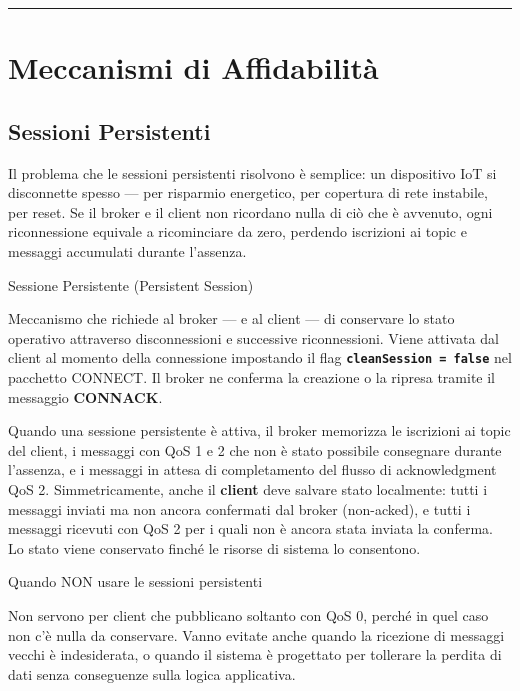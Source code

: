 \documentclass[
  italian,
  openany]{book}
\begin{document}
\begin{center}\rule{0.5\linewidth}{0.5pt}\end{center}

\section{Meccanismi di
Affidabilità}\label{meccanismi-di-affidabilituxe0}

\subsection{Sessioni Persistenti}\label{sessioni-persistenti}

Il problema che le sessioni persistenti risolvono è semplice: un
dispositivo IoT si disconnette spesso --- per risparmio energetico, per
copertura di rete instabile, per reset. Se il broker e il client non
ricordano nulla di ciò che è avvenuto, ogni riconnessione equivale a
ricominciare da zero, perdendo iscrizioni ai topic e messaggi accumulati
durante l'assenza.

\begin{calloutdefinition}{Sessione Persistente (Persistent Session)}

Meccanismo che richiede al broker --- e al client --- di conservare lo
stato operativo attraverso disconnessioni e successive riconnessioni.
Viene attivata dal client al momento della connessione impostando il
flag \textbf{\texttt{cleanSession\ =\ false}} nel pacchetto CONNECT. Il
broker ne conferma la creazione o la ripresa tramite il messaggio
\textbf{CONNACK}.

\end{calloutdefinition}

Quando una sessione persistente è attiva, il broker memorizza le
iscrizioni ai topic del client, i messaggi con QoS 1 e 2 che non è stato
possibile consegnare durante l'assenza, e i messaggi in attesa di
completamento del flusso di acknowledgment QoS 2. Simmetricamente, anche
il \textbf{client} deve salvare stato localmente: tutti i messaggi
inviati ma non ancora confermati dal broker (non-acked), e tutti i
messaggi ricevuti con QoS 2 per i quali non è ancora stata inviata la
conferma. Lo stato viene conservato finché le risorse di sistema lo
consentono.

\begin{calloutwarning}{Quando NON usare le sessioni persistenti}

Non servono per client che pubblicano soltanto con QoS 0, perché in quel
caso non c'è nulla da conservare. Vanno evitate anche quando la
ricezione di messaggi vecchi è indesiderata, o quando il sistema è
progettato per tollerare la perdita di dati senza conseguenze sulla
logica applicativa.

\end{calloutwarning}
\end{document}
